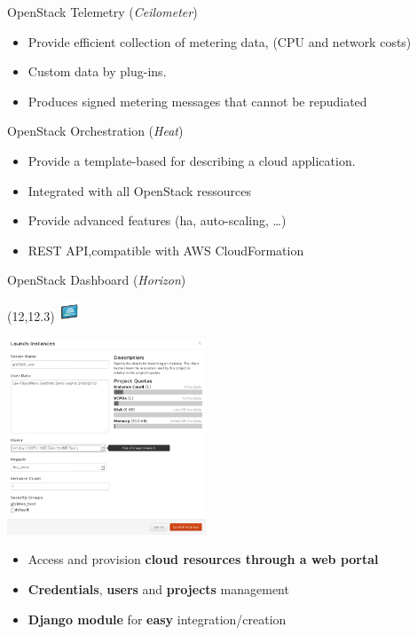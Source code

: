 \begin{frame}{OpenStack Telemetry (\textsl{Ceilometer})}
  \begin{itemize}
    \item Provide efficient collection of metering data, (CPU and network costs)
      \medskip
    \item Custom data by plug-ins.
      \medskip
    \item Produces signed metering messages that cannot be repudiated
  \end{itemize}
\end{frame}

\begin{frame}{OpenStack Orchestration (\textsl{Heat})}
  \begin{itemize}
    \item Provide a template-based for describing a cloud application.
      \medskip
    \item Integrated with all OpenStack ressources
      \medskip
    \item Provide advanced features (ha, auto-scaling, …)
      \medskip
    \item REST API,compatible with AWS CloudFormation
  \end{itemize}
\end{frame}

\begin{frame}{OpenStack Dashboard (\textsl{Horizon})}
  \begin{textblock}{}(12,12.3)
    \includegraphics[width=1.7em]{img/dashboard}
  \end{textblock}
  \begin{table}[t]
    \includegraphics[width=16em]{img/dashboard_ocw}
  \end{table}
    \begin{itemize}
      \item Access and provision \textbf{cloud resources through a web portal}
      \item \textbf{Credentials}, \textbf{users} and \textbf{projects} management
      \item \textbf{Django module} for \textbf{easy} integration/creation
    \end{itemize}
\end{frame}
